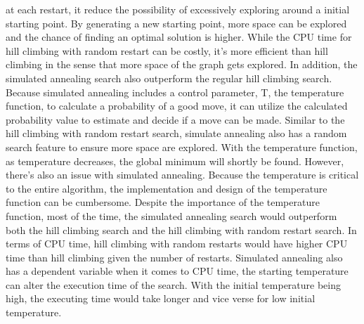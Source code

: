\documentclass[a4paper]{article}
\begin{document}
at each restart, it reduce the possibility of excessively exploring around a initial starting point. By generating a new starting point, more space can be explored and the chance of finding an optimal solution is higher. While the CPU time for hill climbing with random restart can be costly, it's more efficient than hill climbing in the sense that more space of the graph gets explored. In addition, the simulated annealing search also outperform the regular hill climbing search. Because simulated annealing includes a control parameter, T, the temperature function, to calculate a probability of a good move, it can utilize the calculated probability value to estimate and decide if a move can be made. Similar to the hill climbing with random restart search, simulate annealing also has a random search feature to ensure more space are explored. With the temperature function, as temperature decreases, the global minimum will shortly be found. However, there's also an issue with simulated annealing. Because the temperature is critical to the entire algorithm, the implementation and design of the temperature function can be cumbersome. Despite the importance of the temperature function, most of the time, the simulated annealing search would outperform both the hill climbing search and the hill climbing with random restart search.  
In terms of CPU time, hill climbing with random restarts would have higher CPU time than hill climbing given the number of restarts. Simulated annealing also has a dependent variable when it comes to CPU time, the starting temperature can alter the execution time of the search. With the initial temperature being high, the executing time would take longer and vice verse for low initial temperature. 
\end{document}
